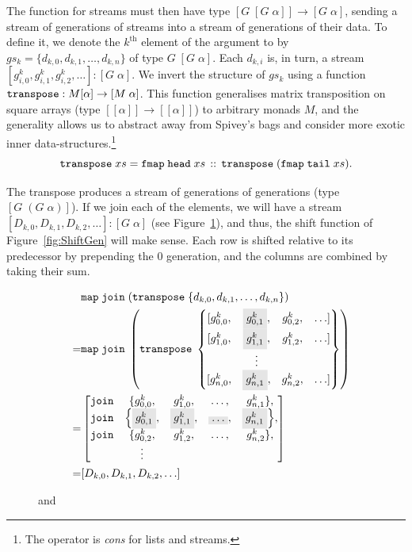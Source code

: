 The  function for streams must then have type $[G\;[G\;\alpha]] \rightarrow [G\;\alpha]$, sending a stream of generations of streams into a stream of generations of their data. To define it, we denote the $k^{\text{th}}$ element of the argument to  by $gs_k = \{d_{k,0}, d_{k,1}, \ldots, d_{k,n}\}$ of type $G\;[G\;\alpha]$. Each $d_{k,i}$ is, in turn, a stream $[g^k_{i,0}, g^k_{i,1}, g^k_{i,2}, \ldots] : [G\;\alpha]$. We invert the structure of $gs_k$ using a function $\texttt{transpose}  : M[\alpha]\rightarrow [M\;\alpha]$. This function generalises matrix transposition on square arrays (type $[[\alpha]]\rightarrow[[\alpha]]$) to arbitrary monads $M$, and the generality allows us to abstract away from Spivey's bags and consider more exotic inner data-structures.\footnote{The operator \code{::} is \emph{cons} for lists and streams.}
\begin{displaymath}
\texttt{transpose}\;xs = \texttt{fmap}\;\texttt{head}\;xs\,::\,\texttt{transpose}\; (\texttt{fmap}\;\texttt{tail}\;xs).
\end{displaymath}

The transpose produces a stream of generations of generations (type $[G\;(G\;\alpha)]$). If we join each of the elements, we will have a stream $[D_{k,0}, D_{k,1}, D_{k,2}, \ldots] : [G\;\alpha]$ (see Figure~\ref{fig:Transpose}), and thus, the shift function of Figure~\ref{fig:ShiftGen} will make sense. Each row is shifted relative to its predecessor by prepending the 0 generation, and the columns are combined by taking their sum.

\begin{figure}
  \begin{align*}
    &\code{map}\;\code{join}\;(\code{transpose}\;\{d_{k,0}, d_{k,1}, \ldots, d_{k,n}\})\\
  = &\code{map}\;\code{join}\;\left(\code{transpose}\;\left\{\begin{matrix}
        [g^k_{0,0}, & \colorbox{gray}{$g^k_{0,1}$}, & g^k_{0,2}, &\ldots]\\
        [g^k_{1,0}, & \colorbox{gray}{$g^k_{1,1}$}, & g^k_{1,2}, &\ldots]\\
                  & \vdots\\
        [g^k_{n,0}, & \colorbox{gray}{$g^k_{n,1}$}, & g^k_{n,2}, &\ldots]
      \end{matrix}\right\}\right)\\
      = &\left[\begin{matrix}
        \code{join}&\{g^k_{0,0}, & g^k_{1,0}, &\ldots, & g^k_{n,1}\},\\
        \code{join}&\Big\{\colorbox{gray}{$g^k_{0,1}$}, & \colorbox{gray}{$g^k_{1,1}$}, &\colorbox{gray}{$\ldots$}, & \colorbox{gray}{$g^k_{n,1}$}\Big\},\\
        \code{join}&\{g^k_{0,2}, & g^k_{1,2}, &\ldots, & g^k_{n,2}\},\\
                   & \vdots
                 \end{matrix}\right]\\
      \quad= &[D_{k,0}, D_{k,1}, D_{k,2}, \ldots]
  \end{align*}
\label{fig:Transpose}
\caption{ and }
\end{figure}

